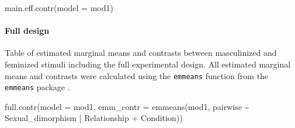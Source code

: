 \documentclass[
  bookmarksnumbered]{article}
\newenvironment{Shaded}{\begin{snugshade}}{\end{snugshade}}
\newcommand{\AttributeTok}[1]{\textcolor[rgb]{0.80,0.80,0.80}{#1}}
\newcommand{\FunctionTok}[1]{\textcolor[rgb]{0.94,0.94,0.56}{#1}}
\newcommand{\NormalTok}[1]{\textcolor[rgb]{0.80,0.80,0.80}{#1}}
\newcommand{\SpecialCharTok}[1]{\textcolor[rgb]{0.86,0.64,0.64}{#1}}
\begin{document}
\begin{Shaded}
\begin{Highlighting}[]
\FunctionTok{main.eff.contr}\NormalTok{(}\AttributeTok{model =}\NormalTok{ mod1)}
\end{Highlighting}
\end{Shaded}

\begin{table}[H]
\centering
\caption{\label{tab:unnamed-chunk-33}Estimated marginal and constrast between masculinized and feminized 
                           stimuli for the DFF model}
\centering
{}
\end{table}

\paragraph{Full design}\label{full-design}

Table of estimated marginal means and contrasts between masculinized and feminized stimuli including the full experimental design. All estimated marginal means and contrasts were calculated using the \texttt{emmeans} function from the \texttt{emmeans} package \autocite{emmeanscit}.

\begin{Shaded}
\begin{Highlighting}[]
\FunctionTok{full.contr}\NormalTok{(}\AttributeTok{model =}\NormalTok{ mod1,}
           \AttributeTok{emm\_contr =} \FunctionTok{emmeans}\NormalTok{(mod1, pairwise }\SpecialCharTok{\textasciitilde{}}\NormalTok{ Sexual\_dimorphism }\SpecialCharTok{|}\NormalTok{ Relationship }\SpecialCharTok{+}\NormalTok{ Condition))}
\end{Highlighting}
\end{Shaded}
\end{document}
